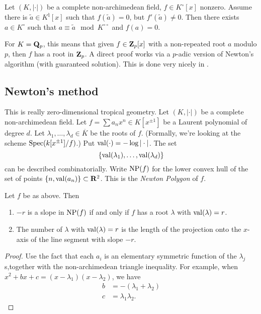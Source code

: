 \begin{corollary}
Let $(K,|\cdot|)$ be a complete non-archimedean field, $f\in K^\circ[x]$ 
nonzero. Assume there is $\tilde a\in K^\natural[x]$ such that $f(\tilde a)=0$, 
but $f'(\tilde a)\ne 0$. Then there exists $a\in K^\circ$ such that 
$a\equiv \tilde a\mod{K^{\circ\circ}}$ and $f(a)=0$. 
\end{corollary}

For $K=\mathbf{Q}_p$, this means that given $f\in \mathbf{Z}_p[x]$ with a non-repeated root 
$a$ modulo $p$, then $f$ has a root in $\mathbf{Z}_p$. A direct proof works via a 
$p$-adic version of Newton's algorithm (with guaranteed solution). This is 
done very nicely in \cite{gouvea-1997}. 





\subsection{Newton's method}

This is really zero-dimensional tropical geometry. Let $(K,|\cdot|)$ be a 
complete non-archimedean field. Let $f=\sum a_n x^n\in K[x^{\pm 1}]$ be a 
Laurent polynomial of degree $d$. Let 
$\lambda_1,\dots,\lambda_d\in \overline K$ be the roots of $f$. (Formally, 
we're looking at the scheme $\operatorname{Spec}(k[x^{\pm 1}]/f)$.) Put 
$\operatorname{val}(\cdot)=-\log|\cdot|$. The set 
\[
	\{\operatorname{val}(\lambda_1),\dots,\operatorname{val}(\lambda_d)\} 
\]
can be described combinatorially. Write $\operatorname{NP}(f)$ for the lower 
convex hull of the set of points $\{n,\operatorname{val}(a_n)\}\subset \mathbf{R}^2$. This is 
the \emph{Newton Polygon} of $f$. 

\begin{theorem}
Let $f$ be as above. Then 
\begin{enumerate}
\item
$-r$ is a slope in $\operatorname{NP}(f)$ if and only if $f$ has a root $\lambda$ 
with $\operatorname{val}(\lambda)=r$. 

\item
The number of $\lambda$ with $\operatorname{val}(\lambda)=r$ is the length of the 
projection onto the $x$-axis of the line segment with slope $-r$. 
\end{enumerate}
\end{theorem}
\begin{proof}
Use the fact that each $a_i$ is an elementary symmetric function of the 
$\lambda_j$s,together with the non-archimedean triangle inequality. For 
example, when $x^2+b x+c=(x-\lambda_1)(x-\lambda_2)$, we have 
\begin{align*}
  b &= -(\lambda_1+\lambda_2) \\
  c &= \lambda_1 \lambda_2 .
\end{align*}
\end{proof}

